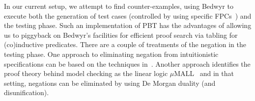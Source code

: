 \documentclass[a4paper]{easychair}
\begin{document}
In our current setup, we attempt to find counter-examples, using
Bedwyr to execute both the generation of test cases (controlled by
using specific FPCs~\cite{Blanco0M19}) and the testing phase.
%
Such an implementation of PBT has the advantages of allowing us to
piggyback on Bedwyr's facilities for efficient proof 
search via tabling for (co)inductive predicates.
%
There are a couple of treatments of the negation in the testing phase.
%
One approach to eliminating negation from intuitionistic specifications
can be based on the techniques in~\cite{Momigliano00}.
%
Another approach identifies the proof theory behind model checking as
the linear logic $\mu$MALL~\cite{HeathM19} and in that setting,
negations can be eliminated by using De Morgan duality (and
disunification).





\end{document}
